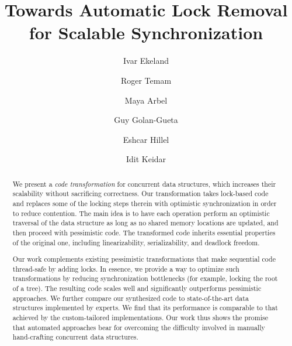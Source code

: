 \documentclass[oribibl]{llncs}
\begin{document}
\title{Towards Automatic Lock Removal\\ for Scalable Synchronization}

\author{Ivar Ekeland \and Roger Temam}
\author{
Maya Arbel\fnmsep{}
\and Guy Golan-Gueta  
\and Eshcar Hillel  
\and Idit Keidar\fnmsep{}} 



\maketitle

\begin{abstract}
We present a \emph{code transformation} for concurrent data structures,
which increases their scalability without sacrificing correctness.
Our transformation takes lock-based code and replaces some of the
locking steps therein with optimistic synchronization in order to reduce contention. The main idea is to
have each operation perform an optimistic traversal of the data structure
as long as no shared memory locations are updated, and then proceed with
pessimistic code. The transformed code inherits essential
properties of the original one, including linearizability, serializability,
and deadlock freedom.

Our work complements existing pessimistic transformations that make
sequential code thread-safe by adding locks.
In essence, we provide a way to optimize such transformations by reducing
synchronization bottlenecks (for example, locking the root of a tree).
The resulting code scales well and significantly outperforms
pessimistic approaches. We further compare our synthesized code to state-of-the-art
data structures implemented by experts.
We find that its performance is comparable %
to that achieved by the custom-tailored implementations.
Our work thus shows the promise that automated approaches
bear for overcoming the difficulty involved in manually
hand-crafting concurrent data structures.

\end{abstract}



\thispagestyle{empty}





%

%








%

%
%
\end{document}
